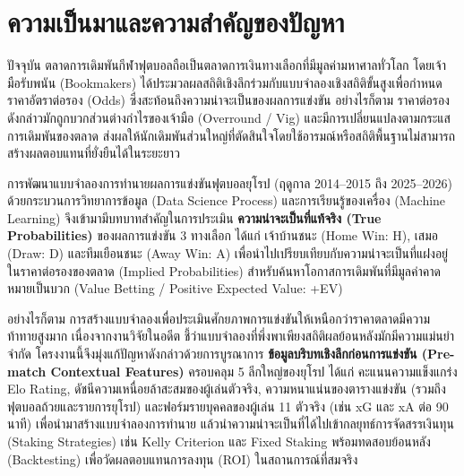 
\section{ความเป็นมาและความสำคัญของปัญหา}

ปัจจุบัน ตลาดการเดิมพันกีฬาฟุตบอลถือเป็นตลาดการเงินทางเลือกที่มีมูลค่ามหาศาลทั่วโลก โดยเจ้ามือรับพนัน (Bookmakers) ได้ประมวลผลสถิติเชิงลึกร่วมกับแบบจำลองเชิงสถิติขั้นสูงเพื่อกำหนดราคาอัตราต่อรอง (Odds) ซึ่งสะท้อนถึงความน่าจะเป็นของผลการแข่งขัน อย่างไรก็ตาม ราคาต่อรองดังกล่าวมักถูกบวกส่วนต่างกำไรของเจ้ามือ (Overround / Vig) และมีการเปลี่ยนแปลงตามกระแสการเดิมพันของตลาด ส่งผลให้นักเดิมพันส่วนใหญ่ที่ตัดสินใจโดยใช้อารมณ์หรือสถิติพื้นฐานไม่สามารถสร้างผลตอบแทนที่ยั่งยืนได้ในระยะยาว 

การพัฒนาแบบจำลองการทำนายผลการแข่งขันฟุตบอลยุโรป (ฤดูกาล 2014--2015 ถึง 2025--2026) ด้วยกระบวนการวิทยาการข้อมูล (Data Science Process) และการเรียนรู้ของเครื่อง (Machine Learning) จึงเข้ามามีบทบาทสำคัญในการประเมิน \textbf{ความน่าจะเป็นที่แท้จริง (True Probabilities)} ของผลการแข่งขัน 3 ทางเลือก ได้แก่ เจ้าบ้านชนะ (Home Win: H), เสมอ (Draw: D) และทีมเยือนชนะ (Away Win: A) เพื่อนำไปเปรียบเทียบกับความน่าจะเป็นที่แฝงอยู่ในราคาต่อรองของตลาด (Implied Probabilities) สำหรับค้นหาโอกาสการเดิมพันที่มีมูลค่าคาดหมายเป็นบวก (Value Betting / Positive Expected Value: +EV)

อย่างไรก็ตาม การสร้างแบบจำลองเพื่อประเมินศักยภาพการแข่งขันให้เหนือกว่าราคาตลาดมีความท้าทายสูงมาก เนื่องจากงานวิจัยในอดีต \cite{hubacek2021forty} ชี้ว่าแบบจำลองที่พึ่งพาเพียงสถิติผลย้อนหลังมักมีความแม่นยำจำกัด โครงงานนี้จึงมุ่งแก้ปัญหาดังกล่าวด้วยการบูรณาการ \textbf{ข้อมูลบริบทเชิงลึกก่อนการแข่งขัน (Pre-match Contextual Features)} ครอบคลุม 5 ลีกใหญ่ของยุโรป ได้แก่ คะแนนความแข็งแกร่ง Elo Rating, ดัชนีความเหนื่อยล้าสะสมของผู้เล่นตัวจริง, ความหนาแน่นของตารางแข่งขัน (รวมถึงฟุตบอลถ้วยและรายการยุโรป) และฟอร์มรายบุคคลของผู้เล่น 11 ตัวจริง (เช่น xG และ xA ต่อ 90 นาที) เพื่อนำมาสร้างแบบจำลองการทำนาย แล้วนำความน่าจะเป็นที่ได้ไปเข้ากลยุทธ์การจัดสรรเงินทุน (Staking Strategies) เช่น Kelly Criterion และ Fixed Staking พร้อมทดสอบย้อนหลัง (Backtesting) เพื่อวัดผลตอบแทนการลงทุน (ROI) ในสถานการณ์ที่สมจริง

